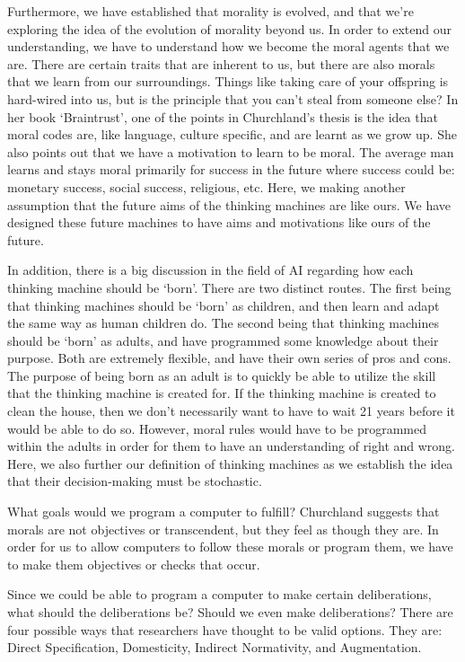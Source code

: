 \documentclass[11pt, oneside]{article}
\begin{document}
\par Furthermore, we have established that morality is evolved, and that we're exploring the idea of the evolution of morality beyond us. In order to extend our understanding, we have to understand how we become the moral agents that we are. There are certain traits that are inherent to us, but there are also morals that we learn from our surroundings. Things like taking care of your offspring is hard-wired into us, but is the principle that you can't steal from someone else? In her book `Braintrust', one of the points in Churchland's thesis is the idea that moral codes are, like language, culture specific, and are learnt as we grow up. She also points out that we have a motivation to learn to be moral. The average man learns and stays moral primarily for success in the future where success could be: monetary success, social success, religious, etc. Here, we making another assumption that the future aims of the thinking machines are like ours. We have designed these future machines to have aims and motivations like ours of the future.

\par In addition, there is a big discussion in the field of AI regarding how each thinking machine should be `born'. There are two distinct routes. The first being that thinking machines should be `born' as children, and then learn and adapt the same way as human children do. The second being that thinking machines should be `born' as adults, and have programmed some knowledge about their purpose. Both are extremely flexible, and have their own series of pros and cons. The purpose of being born as an adult is to quickly be able to utilize the skill that the thinking machine is created for. If the thinking machine is created to clean the house, then we don't necessarily want to have to wait 21 years before it would be able to do so. However, moral rules would have to be programmed within the adults in order for them to have an understanding of right and wrong. Here, we also further our definition of thinking machines as we establish the idea that their decision-making must be stochastic. 

\par What goals would we program a computer to fulfill? Churchland suggests that morals are not objectives or transcendent, but they feel as though they are. In order for us to allow computers to follow these morals or program them, we have to make them objectives or checks that occur. 

\par Since we could be able to program a computer to make certain deliberations, what should the deliberations be? Should we even make deliberations? There are four possible ways that researchers have thought to be valid options. They are: Direct Specification, Domesticity, Indirect Normativity, and Augmentation.
\end{document}
